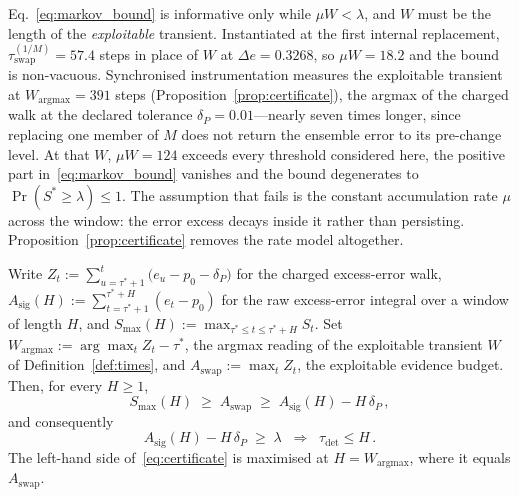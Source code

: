 \documentclass[smallextended]{svjour3}
\newcommand{\DeltaPtext}{0.01}               %
\newcommand{\SixCanonDeltaE}{0.3268}         %
\newcommand{\SixTauFirst}{57.4}              %
\newcommand{\SixTauErase}{391}              %
\newcommand{\SixMuWfirst}{18.2}              %
\newcommand{\SixMuWerase}{124}               %
\begin{document}
\begin{remark}\label{rem:transient_length}
  Eq.~\eqref{eq:markov_bound} is informative only while $\mu W < \lambda$, and $W$ must be the length of the \emph{exploitable} transient. Instantiated at the first internal replacement, $\tau_{\mathrm{swap}}^{(1/M)} = \SixTauFirst$ steps in place of $W$ at $\Delta e = \SixCanonDeltaE$, so $\mu W = \SixMuWfirst$ and the bound is non-vacuous. Synchronised instrumentation measures the exploitable transient at $W_{\mathrm{argmax}} = \SixTauErase$ steps (Proposition~\ref{prop:certificate}), the argmax of the charged walk at the declared tolerance $\delta_P = \DeltaPtext$---nearly seven times longer, since replacing one member of $M$ does not return the ensemble error to its pre-change level. At that $W$, $\mu W = \SixMuWerase$ exceeds every threshold considered here, the positive part in~\eqref{eq:markov_bound} vanishes and the bound degenerates to $\Pr(S^* \ge \lambda) \le 1$. The assumption that fails is the constant accumulation rate $\mu$ across the window: the error excess decays inside it rather than persisting. Proposition~\ref{prop:certificate} removes the rate model altogether.
\end{remark}

\begin{proposition}\label{prop:certificate}
  Write $Z_t := \sum_{u = \tau^*+1}^{t}\bigl(e_u - p_0 - \delta_P\bigr)$ for the charged excess-error walk, $A_{\mathrm{sig}}(H) := \sum_{t = \tau^*+1}^{\tau^*+H}(e_t - p_0)$ for the raw excess-error integral over a window of length $H$, and $S_{\max}(H) := \max_{\tau^* \le t \le \tau^*+H} S_t$. Set $W_{\mathrm{argmax}} := \arg\max_{t} Z_t - \tau^*$, the argmax reading of the exploitable transient $W$ of Definition~\ref{def:times}, and $A_{\mathrm{swap}} := \max_t Z_t$, the exploitable evidence budget. Then, for every $H \ge 1$,
  \begin{equation}\label{eq:cert_chain}
    S_{\max}(H) \;\ge\; A_{\mathrm{swap}} \;\ge\; A_{\mathrm{sig}}(H) - H\,\delta_P\,,
  \end{equation}
  and consequently
  \begin{equation}\label{eq:certificate}
    A_{\mathrm{sig}}(H) - H\,\delta_P \;\ge\; \lambda \;\;\Longrightarrow\;\; \tau_{\mathrm{det}} \le H\,.
  \end{equation}
  The left-hand side of~\eqref{eq:certificate} is maximised at $H = W_{\mathrm{argmax}}$, where it equals $A_{\mathrm{swap}}$.
\end{proposition}
\end{document}
